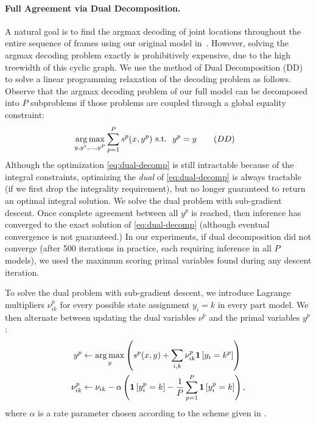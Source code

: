 \paragraph{Full Agreement via Dual Decomposition.} A natural goal is
to find the argmax decoding of joint locations throughout the entire
sequence of frames using our original model in~.  However, 
solving the argmax decoding problem
exactly is prohibitively expensive, due to the high treewidth of this
cyclic graph. We use the method of Dual Decomposition (DD)
\cite{bertsekas99,komodakis2007dualdecomp} to solve a linear
programming relaxation of the decoding problem as follows. Observe
that the argmax decoding problem of our full model can be decomposed
into $P$ subproblems { if those problems are coupled through a global
  equality constraint}:
\begin{align}
  \label{eq:dual-decomp}
&\mathop{\arg\max}_{y, y^1,\dots,y^P} \sum_{p=1}^P s^p(x,y^p)  \textrm{ s.t. } \:  y^p=y  \quad{}\quad{(DD)}
\end{align}
Although the optimization \eqref{eq:dual-decomp} is still intractable because of the integral constraints, optimizing the {\em dual} of \eqref{eq:dual-decomp} is always
tractable (if we first drop the integrality requirement), but no longer guaranteed to return an optimal integral solution. We solve the dual problem with sub-gradient descent. Once complete agreement between all
$y^p$ is reached, then inference has converged to the exact solution
of \eqref{eq:dual-decomp} (although eventual convergence is not
guaranteed.) In our experiments, if dual decomposition did not
converge (after 500 iterations in practice, each requiring inference in all $P$ models), we used the maximum scoring primal variables found during
any descent iteration.

To solve the dual problem with sub-gradient descent, we introduce
Lagrange multipliers $\nu_{ik}^p$ for every possible state assignment
$y_i = k$ in every part model. We then alternate between updating the
dual variables $\nu^p$ and the primal variables $y^p$:
\begin{align}
  y^p & \leftarrow \mathop{\arg\max}_y \left( s^p(x,y) +  \sum_{i,k} \nu^p_{ik} \mathbf{1}\left[y_i=k^p\right]\right) \\
  \nu^p_{ik} & \leftarrow \nu_{ik} - \alpha\left(  \mathbf{1}\left[y_i^p=k\right] - 
\frac{1}{P}\sum_{p=1}^P \mathbf{1}\left[y_i^p=k\right] \right),
\end{align}
where $\alpha$ is a rate parameter chosen according to the scheme given in \cite{komodakis2007dualdecomp}.
 


